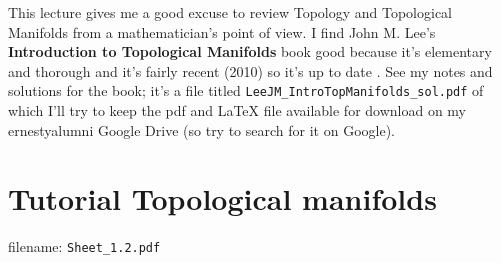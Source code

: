 \documentclass[10pt]{amsart}
\begin{document}
\begin{multicols*}{2}
This lecture gives me a good excuse to review Topology and Topological Manifolds from a mathematician's point of view.  I find John M. Lee's \textbf{Introduction to Topological Manifolds} book good because it's elementary and thorough and it's fairly recent (2010) so it's up to date \cite{JMLee2010}.  See my notes and solutions for the book; it's a file titled \verb|LeeJM_IntroTopManifolds_sol.pdf| of which I'll try to keep the pdf and LaTeX file available for download on my ernestyalumni Google Drive (so try to search for it on Google).  





\section*{Tutorial Topological manifolds}

filename: \verb|Sheet_1.2.pdf|


\end{multicols*}
\end{document}
